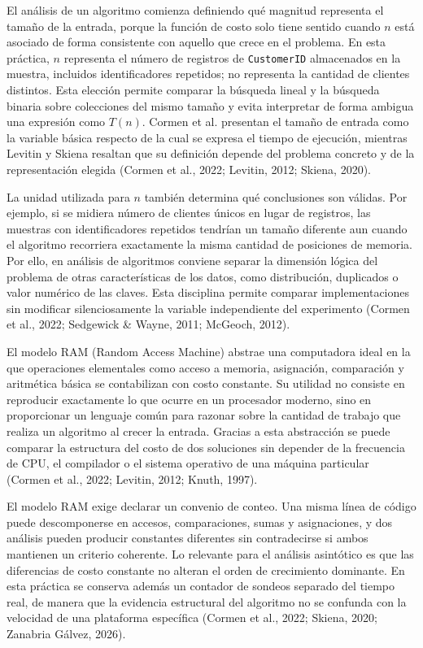 
El análisis de un algoritmo comienza definiendo qué magnitud representa el tamaño de la entrada, porque la función de costo solo tiene sentido cuando $n$ está asociado de forma consistente con aquello que crece en el problema. En esta práctica, $n$ representa el número de registros de \texttt{CustomerID} almacenados en la muestra, incluidos identificadores repetidos; no representa la cantidad de clientes distintos. Esta elección permite comparar la búsqueda lineal y la búsqueda binaria sobre colecciones del mismo tamaño y evita interpretar de forma ambigua una expresión como $T(n)$. Cormen et al. presentan el tamaño de entrada como la variable básica respecto de la cual se expresa el tiempo de ejecución, mientras Levitin y Skiena resaltan que su definición depende del problema concreto y de la representación elegida (Cormen et al., 2022; Levitin, 2012; Skiena, 2020).

La unidad utilizada para $n$ también determina qué conclusiones son válidas. Por ejemplo, si se midiera número de clientes únicos en lugar de registros, las muestras con identificadores repetidos tendrían un tamaño diferente aun cuando el algoritmo recorriera exactamente la misma cantidad de posiciones de memoria. Por ello, en análisis de algoritmos conviene separar la dimensión lógica del problema de otras características de los datos, como distribución, duplicados o valor numérico de las claves. Esta disciplina permite comparar implementaciones sin modificar silenciosamente la variable independiente del experimento (Cormen et al., 2022; Sedgewick \& Wayne, 2011; McGeoch, 2012).

El modelo RAM (Random Access Machine) abstrae una computadora ideal en la que operaciones elementales como acceso a memoria, asignación, comparación y aritmética básica se contabilizan con costo constante. Su utilidad no consiste en reproducir exactamente lo que ocurre en un procesador moderno, sino en proporcionar un lenguaje común para razonar sobre la cantidad de trabajo que realiza un algoritmo al crecer la entrada. Gracias a esta abstracción se puede comparar la estructura del costo de dos soluciones sin depender de la frecuencia de CPU, el compilador o el sistema operativo de una máquina particular (Cormen et al., 2022; Levitin, 2012; Knuth, 1997).

El modelo RAM exige declarar un convenio de conteo. Una misma línea de código puede descomponerse en accesos, comparaciones, sumas y asignaciones, y dos análisis pueden producir constantes diferentes sin contradecirse si ambos mantienen un criterio coherente. Lo relevante para el análisis asintótico es que las diferencias de costo constante no alteran el orden de crecimiento dominante. En esta práctica se conserva además un contador de sondeos separado del tiempo real, de manera que la evidencia estructural del algoritmo no se confunda con la velocidad de una plataforma específica (Cormen et al., 2022; Skiena, 2020; Zanabria Gálvez, 2026).

